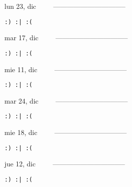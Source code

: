 \documentclass[letterpaper,10pt]{article}
\begin{document}
\begin{multicols}{3}
{lun 23, dic\ \ \ \ \ --------------------------------}
\begin{flushright}\begin{small}\texttt{:) :| :(}\end{small}\end{flushright}
\vfill
{mar 17, dic\ \ \ \ \ --------------------------------}
\begin{flushright}\begin{small}\texttt{:) :| :(}\end{small}\end{flushright}\par
\vfill
{mie 11, dic\ \ \ \ \ --------------------------------}
\begin{flushright}\begin{small}\texttt{:) :| :(}\end{small}\end{flushright}\par
\vfill
\end{multicols}
\vspace{1.05cm}

\begin{multicols}{3}
{mar 24, dic\ \ \ \ \ --------------------------------}
\begin{flushright}\begin{small}\texttt{:) :| :(}\end{small}\end{flushright}
\vfill
{mie 18, dic\ \ \ \ \ --------------------------------}
\begin{flushright}\begin{small}\texttt{:) :| :(}\end{small}\end{flushright}\par
\vfill
{jue 12, dic\ \ \ \ \ --------------------------------}
\begin{flushright}\begin{small}\texttt{:) :| :(}\end{small}\end{flushright}\par
\vfill
\end{multicols}
\vspace{1.05cm}
\end{document}
